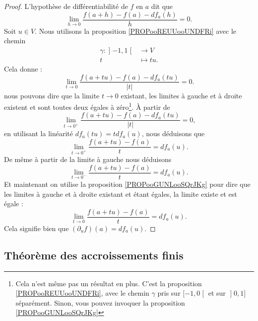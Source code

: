 \begin{proof}
	L'hypothèse de différentiabilité de \( f\) en \( a\) dit que
	\begin{equation}
		\lim_{h\to 0} \frac{ f(a+h)-f(a)-df_a(h) }{ h }=0.
	\end{equation}
	Soit \( u\in V\). Nous utilisons la proposition \ref{PROPooREUUooUNDFRi} avec le chemin
	\begin{equation}
		\begin{aligned}
			\gamma\colon \mathopen] -1,1\mathclose[ & \to V       \\
			t                                       & \mapsto tu.
		\end{aligned}
	\end{equation}
	Cela donne :
	\begin{equation}
		\lim_{t\to 0}\frac{ f(a+tu)-f(a)-df_a(tu) }{ | t | }=0.
	\end{equation}
	nous pouvons dire que la limite \( t\to 0\) existant, les limites à gauche et à droite existent et sont toutes deux égales à zéro\footnote{Cela n'est même pas un résultat en plus. C'est la proposition \ref{PROPooREUUooUNDFRi}, avec le chemin $ \gamma $ pris sur $ \mathopen[ -1,0\mathclose[$ et sur $ \mathopen] 0,1\mathclose]$ séparément. Sinon, vous pouvez invoquer la proposition \ref{PROPooGUNLooSQrJKg}}. À partir de
	\begin{equation}
		\lim_{t\to 0^+}\frac{ f(a+tu)-f(a)-df_a(tu) }{ | t | }=0,
	\end{equation}
	en utilisant la linéarité \( df_a(tu)=tdf_a(u)\), nous déduisons que
	\begin{equation}
		\lim_{t\to 0^+}\frac{ f(a+tu)-f(a) }{t}=df_a(u).
	\end{equation}
	De même à partir de la limite à gauche nous déduisons
	\begin{equation}
		\lim_{t\to 0^-}\frac{ f(a+tu)-f(a) }{t}=df_a(u).
	\end{equation}
	Et maintenant on utilise la proposition \ref{PROPooGUNLooSQrJKg} pour dire que les limites à gauche et à droite existant et étant égales, la limite existe et est égale :
	\begin{equation}
		\lim_{t\to 0}\frac{ f(a+tu)-f(a) }{t}=df_a(u).
	\end{equation}
	Cela signifie bien que \( (\partial_uf)(a)=df_a(u)\).
\end{proof}

\subsection{Théorème des accroissements finis}

